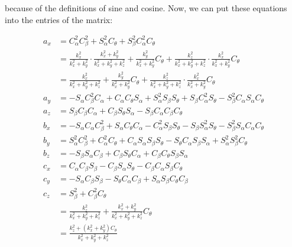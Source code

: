 \documentclass[a4paper,11pt]{article}
\begin{document}
\begin {enumerate}
		because of the definitions of sine and cosine. Now, we can put these equations into the entries of the matrix:
		
		\begin{align*}
			a_x &= C_{\alpha}^2C_{\beta}^2 + S_{\alpha}^2C_{\theta} + S_{\beta}^2C_{\alpha}^2C_{\theta}\\
			&= \frac{k_x^2}{k_x^2 + k_y^2} \cdot \frac{k_x^2 + k_y^2}{k_x^2 + k_y^2 + k_z^2} + \frac{k_y^2}{k_x^2+k_y^2}C_{\theta} + \frac{k_z^2}{k_x^2+k_y^2+k_z^2} \cdot \frac{k_x^2}{k_x^2+k_y^2}C_{\theta}\\
			&= \frac{k_x^2}{k_x^2 + k_y^2 + k_z^2} + \frac{k_y^2}{k_x^2+k_y^2}C_{\theta} + \frac{k_z^2}{k_x^2+k_y^2+k_z^2} \cdot \frac{k_x^2}{k_x^2+k_y^2}C_{\theta}\\
			a_y &= -S_{\alpha}C_{\beta}^2C_{\alpha} + C_{\alpha}C_{\theta}S_{\alpha} + S_{\alpha}^2S_{\beta}S_{\theta} + S_{\beta}C_{\alpha}^2S_{\theta} - S_{\beta}^2C_{\alpha}S_{\alpha}C_{\theta}\\
			a_z &= S_{\beta}C_{\beta}C_{\alpha} + C_{\beta}S_{\theta}S_{\alpha} - S_{\beta}C_{\alpha}C_{\beta}C_{\theta}\\
			b_x &= -S_{\alpha}C_{\alpha}C_{\beta}^2 + S_{\alpha}C_{\theta}C_{\alpha} - C_{\alpha}^2S_{\beta}S_{\theta} - S_{\beta}S_{\alpha}^2S_{\theta} - S_{\beta}^2S_{\alpha}C_{\alpha}C_{\theta}\\
			b_y &= S_{\alpha}^2C_{\beta}^2 + C_{\alpha}^2C_{\theta} + C_{\alpha}S_{\alpha}S_{\beta}S_{\theta} - S_{\theta}C_{\alpha}S_{\beta}S_{\alpha} + S_{\alpha}^2S_{\beta}^2C_{\theta}\\
			b_z &= -S_{\beta}S_{\alpha}C_{\beta} + C_{\beta}S_{\theta}C_{\alpha} + C_{\beta}C_{\theta}S_{\beta}S_{\alpha}\\
			c_x &= C_{\alpha}C_{\beta}S_{\beta} - C_{\beta}S_{\alpha}S_{\theta} - C_{\beta}C_{\alpha}S_{\beta}C_{\theta}\\
			c_y &= -S_{\alpha}C_{\beta}S_{\beta} - S_{\theta}C_{\alpha}C_{\beta} + S_{\alpha}S_{\beta}C_{\theta}C_{\beta}\\
			c_z &= S_{\beta}^2 + C_{\beta}^2C_{\theta}\\
			&= \frac{k_z^2}{k_x^2+k_y^2+k_z^2} + \frac{k_x^2 + k_y^2}{k_x^2 + k_y^2 + k_z^2} C_{\theta}\\
			&= \frac{k_z^2 + (k_x^2 + k_y^2) C_{\theta}}{k_x^2 + k_y^2 + k_z^2}
		\end{align*}
		
		
		
\end {enumerate}
\end{document}
